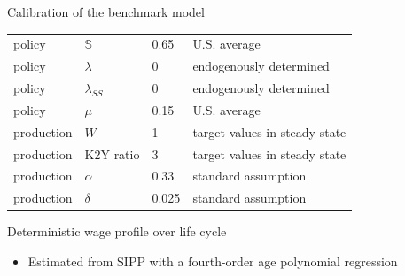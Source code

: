 \documentclass{beamer}
\begin{document}
\begin{frame}{Calibration of the benchmark model}
\begin{table}[p]
\begin{adjustbox}{width={0.8\textwidth}}
\begin{tabular}{llll}
				policy            & $\mathbb{S}$                & 0.65   & U.S. average                         \\
				policy            & $\lambda$                   & 0      & endogenously determined              \\
				policy            & $\lambda_{SS}$              & 0      & endogenously determined              \\
				policy            & $\mu$                       & 0.15   & U.S. average                         \\
				\hline 
				production        & $W$                         & 1      & target values in steady state        \\
				production        & K2Y ratio                   & 3      & target values in steady state        \\
				production        & $\alpha$                    & 0.33   & standard assumption                  \\
				production        & $\delta$                    & 0.025  & standard assumption          \\
				\hline 
			\end{tabular} 
		\end{adjustbox}
	\end{table}
	\hyperlink{StE_dist_compare}{} 
\end{frame}

\begin{frame}{Deterministic wage profile over life cycle}
	\begin{figure}[!ht]
		\begin{center}
		\end{center}
	\end{figure}
	\begin{itemize}
		\item 	{\scriptsize Estimated from SIPP with a fourth-order age polynomial regression}
	\end{itemize}
	
\end{frame}
\end{document}

